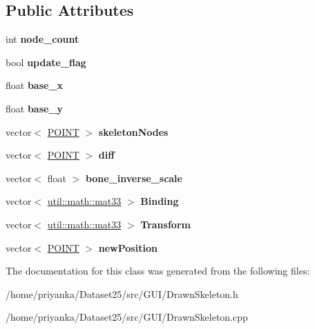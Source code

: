 \subsection*{\-Public \-Attributes}
\begin{DoxyCompactItemize}
\item 
\hypertarget{classDrawnSkeleton_ae971e61b960b25a06e9a086ab30d4164}{int {\bfseries node\-\_\-count}}\label{classDrawnSkeleton_ae971e61b960b25a06e9a086ab30d4164}

\item 
\hypertarget{classDrawnSkeleton_a06ead449a985f64a8e30e748bd501b06}{bool {\bfseries update\-\_\-flag}}\label{classDrawnSkeleton_a06ead449a985f64a8e30e748bd501b06}

\item 
\hypertarget{classDrawnSkeleton_a381328c50a2d345fb5815572ffb04ea9}{float {\bfseries base\-\_\-x}}\label{classDrawnSkeleton_a381328c50a2d345fb5815572ffb04ea9}

\item 
\hypertarget{classDrawnSkeleton_a59389e3ca0ed18f268ab2ed9f3c94dbb}{float {\bfseries base\-\_\-y}}\label{classDrawnSkeleton_a59389e3ca0ed18f268ab2ed9f3c94dbb}

\item 
\hypertarget{classDrawnSkeleton_a1d9c8842f31312c2d83ad327949ef2d7}{vector$<$ \hyperlink{structPOINT}{\-P\-O\-I\-N\-T} $>$ {\bfseries skeleton\-Nodes}}\label{classDrawnSkeleton_a1d9c8842f31312c2d83ad327949ef2d7}

\item 
\hypertarget{classDrawnSkeleton_aecfe65d1b552f2b7fb2ececada22a743}{vector$<$ \hyperlink{structPOINT}{\-P\-O\-I\-N\-T} $>$ {\bfseries diff}}\label{classDrawnSkeleton_aecfe65d1b552f2b7fb2ececada22a743}

\item 
\hypertarget{classDrawnSkeleton_ab0f7ec52b128c90a8593287776bacb6e}{vector$<$ float $>$ {\bfseries bone\-\_\-inverse\-\_\-scale}}\label{classDrawnSkeleton_ab0f7ec52b128c90a8593287776bacb6e}

\item 
\hypertarget{classDrawnSkeleton_ab438fd7fadc23f3dd48d963544b793af}{vector$<$ \hyperlink{classutil_1_1math_1_1mat33}{util\-::math\-::mat33} $>$ {\bfseries \-Binding}}\label{classDrawnSkeleton_ab438fd7fadc23f3dd48d963544b793af}

\item 
\hypertarget{classDrawnSkeleton_ac220e0fe2ed0957aa7ee4adc9486912d}{vector$<$ \hyperlink{classutil_1_1math_1_1mat33}{util\-::math\-::mat33} $>$ {\bfseries \-Transform}}\label{classDrawnSkeleton_ac220e0fe2ed0957aa7ee4adc9486912d}

\item 
\hypertarget{classDrawnSkeleton_a1784c60f2441c33c0c9e25dd43b0202d}{vector$<$ \hyperlink{structPOINT}{\-P\-O\-I\-N\-T} $>$ {\bfseries new\-Position}}\label{classDrawnSkeleton_a1784c60f2441c33c0c9e25dd43b0202d}

\end{DoxyCompactItemize}


\-The documentation for this class was generated from the following files\-:\begin{DoxyCompactItemize}
\item 
/home/priyanka/\-Dataset25/src/\-G\-U\-I/\-Drawn\-Skeleton.\-h\item 
/home/priyanka/\-Dataset25/src/\-G\-U\-I/\-Drawn\-Skeleton.\-cpp\end{DoxyCompactItemize}
